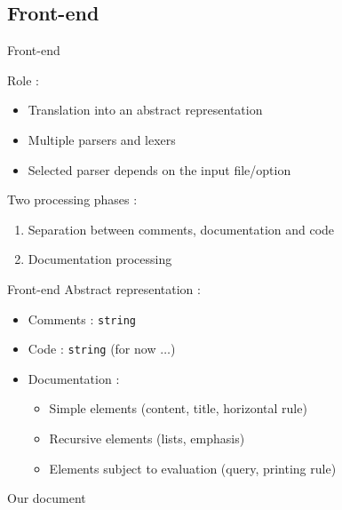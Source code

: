 \documentclass[compress]{beamer}
\newenvironment{tframe}[1]{
  \subsection{#1}
  \begin{frame}{#1}
  }{
  \end{frame}
  }
\begin{document}
  \begin{tframe}{Front-end}
    Role :
    \begin{itemize}
      \item Translation into an abstract representation
      \item Multiple parsers and lexers
      \item Selected parser depends on the input file/option
    \end{itemize}

    \vfill
    Two processing phases :
    \begin{enumerate}
      \item Separation between comments, documentation and code
      \item Documentation processing
    \end{enumerate}
  \end{tframe}
  \begin{frame}{Front-end}
      Abstract representation  :
      \begin{itemize}
        \item Comments : \texttt{string}
        \item Code : \texttt{string} (for now $\ldots$)
        \item Documentation : \\
          \begin{itemize}
            \item Simple elements (content, title, horizontal rule)
            \item Recursive elements (lists, emphasis)
            \item Elements subject to evaluation (query, printing rule)
          \end{itemize}
      \end{itemize}
    \end{frame}
    \begin{frame}[containsverbatim]{Our document}
    \begin{center}
    \end{center}
    \end{frame}
\end{document}
